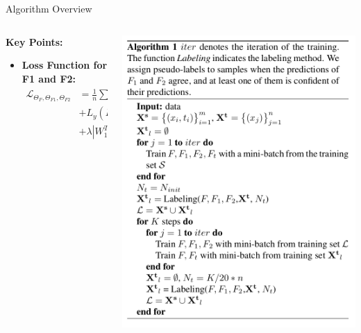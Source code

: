 \documentclass{beamer}
\begin{document}
\begin{frame}{Algorithm Overview}
    \begin{columns}
      \begin{column}{0.5\textwidth}
        \small %
        \textbf{Key Points:}
        \begin{itemize}
          \item \textbf{Loss Function for F1 and F2:}
          \tiny \[
            \begin{aligned}
            \mathcal{L}_{\Theta_F,\Theta_{F1},\Theta_{F2}} &= \frac{1}{n} \sum_{i=1}^{n} [L_y(F_1(F(x_i)); y_i)\\ &+ L_y(F_2(F(x_i)); y_i)] \\
            &+ \lambda |W_1^T W_2|
            \end{aligned}
          \]
        \end{itemize}
      \end{column}
    
      \begin{column}{0.5\textwidth}
        \centering
        \includegraphics[width=\textwidth]{algo_att.png}
      \end{column}
    \end{columns}
\end{frame}
\end{document}
